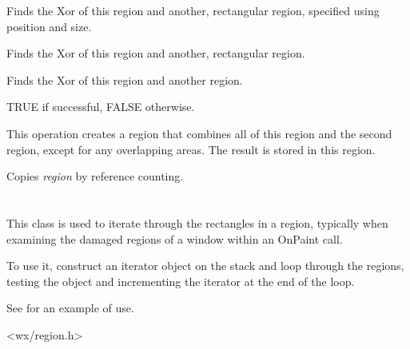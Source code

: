 
Finds the Xor of this region and another, rectangular region, specified using position and size.


Finds the Xor of this region and another, rectangular region.


Finds the Xor of this region and another region.


TRUE if successful, FALSE otherwise.


This operation creates a region that combines all of this region and the second region, except
for any overlapping areas. The result is stored in this region.

\label{wxregionassign}


Copies {\it region} by reference counting.

\section{}\label{wxregioniterator}

This class is used to iterate through the rectangles in a region,
typically when examining the damaged regions of a window within an OnPaint call.

To use it, construct an iterator object on the stack and loop through the
regions, testing the object and incrementing the iterator at the end of the loop.

See  for an example of use.




<wx/region.h>





